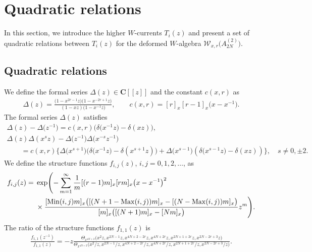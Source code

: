 \documentclass[pdftex]{sigma}
\numberwithin{equation}{section}
\begin{document}
\section{Quadratic relations}
\label{section:3}

In this section, we introduce the higher $W$-currents $T_i(z)$ and present
a set of quadratic relations {between}
$T_i(z)$ for the deformed $W$-algebra
${\mathcal W}_{x,r}\big(A_{2N}^{(2)}\big)$.


\subsection{Quadratic relations}

We define the formal series
$\Delta(z)\in {\mathbf C}[[z]]$ and the constant $c(x,r)$ as
\begin{gather*}
\Delta(z)=\frac{\big(1-x^{2r-1}z\big)\big(1-x^{-2r+1}z\big)}{(1-xz)\big(1-x^{-1}z\big)},\qquad
c(x,r)=[r]_x[r-1]_x\big(x-x^{-1}\big).
\end{gather*}
The formal series $\Delta(z)$ satisfies
\begin{gather*}
\Delta(z)-\Delta\big(z^{-1}\big)=c(x,r)\big(\delta\big(x^{-1}z\big)-\delta(xz)\big),
\\
\Delta(z)\Delta(x^sz)-\Delta\big(z^{-1}\big)\Delta\big(x^{-s}z^{-1}\big)
\\ \qquad\!
{}=c(x,r)\big\{\Delta\big(x^{s+1}\big)\big(\delta\big(x^{-1}z\big)-\delta(x^{s+1}z)\big)
+\Delta\big(x^{s-1}\big)(\delta\big(x^{s-1}z\big)-\delta(xz))\big\},\quad
s \neq 0, \pm2.
\end{gather*}
We define the structure functions $f_{i,j}(z)$, $i, j=0,1,2,\dots$, as
\begin{align}
f_{i,j}(z)={} &\exp\Biggl({-}\sum_{m=1}^\infty
\frac{1}{m}[(r-1)m]_x[rm]_x\big(x-x^{-1}\big)^2\notag
\\
&
{} \times\frac{[\operatorname{Min}(i,j)m]_x
\big([(N+1-\operatorname{Max}(i,j))m]_x-[(N-\operatorname{Max}(i,j))m]_x\big)
}{[m]_x\big([(N+1)m]_x-[Nm]_x\big)}z^m\Biggr).
\label{def:fij}
\end{align}
The ratio of the structure functions $f_{1,1}(z)$ is
\begin{gather*}
\frac{f_{1,1}(z^{-1})}{f_{1,1}(z)}=-z
\frac{\Theta_{x^{4N+2}}\big(x^2z, x^{2N-1}z, x^{4N+2-2r}z, x^{4N+2r}z, x^{2N+1+2r}z,x^{2N-2r+3}z\big)}
{\Theta_{x^{4N+2}}\big(x^2/z, x^{2N-1}/z, x^{4N+2-2r}/z, x^{4N+2r}/z, x^{2N+1+2r}/z, x^{2N-2r+3}/z\big)}.
\end{gather*}
\end{document}
